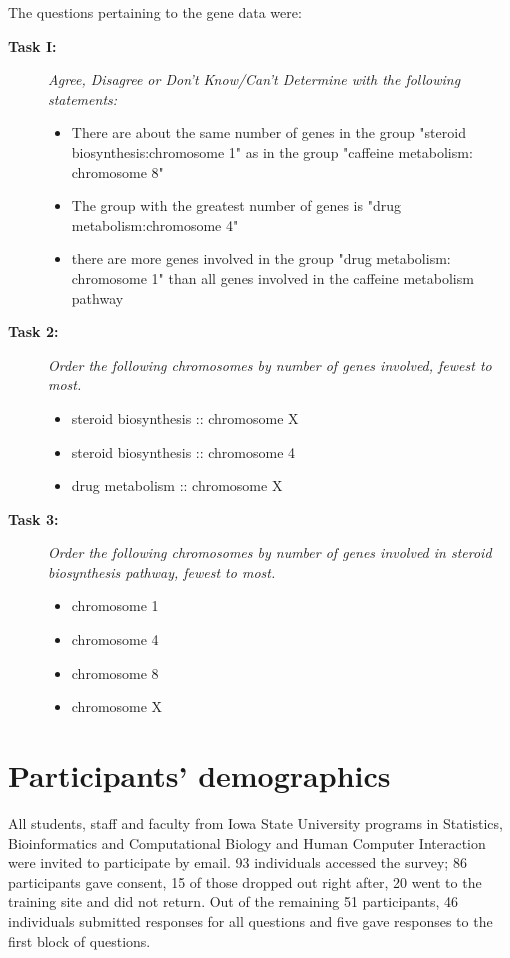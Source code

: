 \documentclass[journal]{vgtc}\usepackage{graphicx, color}
\begin{document}
\noindent The questions pertaining to the gene data were: 


\begin{description}
\item[\bf Task I:]\emph{ Agree, Disagree or Don't Know/Can't Determine with the following statements:}
\begin{itemize}
\item There are about the same number of genes in the group "steroid biosynthesis:chromosome 1" as in the group "caffeine metabolism: chromosome 8"
\item The group with the greatest number of genes is "drug metabolism:chromosome 4"
\item there are more genes involved in the group "drug metabolism: chromosome 1" than all genes involved in the caffeine metabolism pathway
\end{itemize}

\item[\bf Task 2: \ ]\emph{ Order the following chromosomes by number of genes involved, fewest to most.}
\begin{itemize}
\item steroid biosynthesis :: chromosome X
\item steroid biosynthesis :: chromosome 4
\item drug metabolism :: chromosome X
\end{itemize} 

\item[\bf Task 3: \ ] \emph{ Order the following chromosomes by number of genes involved in steroid biosynthesis pathway, fewest to most.}
\begin{itemize}
\item chromosome 1
\item chromosome 4
\item chromosome 8 
\item chromosome X
\end{itemize}

\end{description} 


%
\section{Participants' demographics}
All students, staff and faculty from Iowa State University programs in Statistics, Bioinformatics and Computational Biology and Human Computer Interaction were invited to participate by email. 93 individuals accessed the survey;
86 participants gave consent, 15  of those dropped out right after, 20 went to the training site and did not return.
Out of the remaining 51 participants, 46  individuals submitted responses for all questions and five gave responses to the first block of questions.
\end{document}
